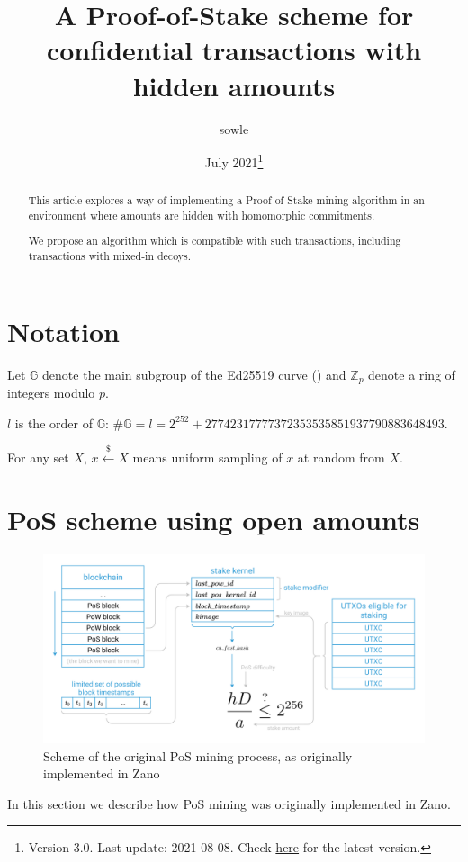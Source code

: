 \documentclass{article}
\title{\huge{\textbf{A Proof-of-Stake scheme for confidential transactions with hidden amounts}}}
\author{\large{sowle}}
\affil{\small{Zano project \\ \texttt{val@zano.org} \\ \url{https://zano.org}}}
\date{\small{July 2021\footnote{Version 3.0. Last update: 2021-08-08. Check \href{https://github.com/hyle-team/docs/tree/master/PoS/PoS_with_HA}{here} for the latest version.}}}
\numberwithin{figure}{section}
\begin{document}
\maketitle

\begin{abstract}
This article explores a way of implementing a Proof-of-Stake mining algorithm in an environment where amounts are hidden with homomorphic commitments.

We propose an algorithm which is compatible with such transactions, including transactions with mixed-in decoys.
\end{abstract}

\section{Notation}
Let $\mathbb{G}$ denote the main subgroup of the Ed25519 curve (\cite{ed25519_site}) and $\mathbb{Z}_p$ denote a ring of integers modulo $p$.

$l$ is the order of $\mathbb{G}$: $\#\mathbb{G} = l = 2^{252} + 27742317777372353535851937790883648493$.

For  any  set $X$, $x \stackrel{\$}{\leftarrow} X$ means uniform  sampling of $x$ at random from $X$. 



\section{PoS scheme using open amounts} \label{sec_open_amounts}

\begin{figure}[ht!]
\centering
\includegraphics[scale=0.665]{fig_1.png}
\caption{Scheme of the original PoS mining process, as originally implemented in Zano}
\label{fig:1.1}
\end{figure}

\indent
In this section we describe how PoS mining was originally implemented in Zano.
\end{document}
